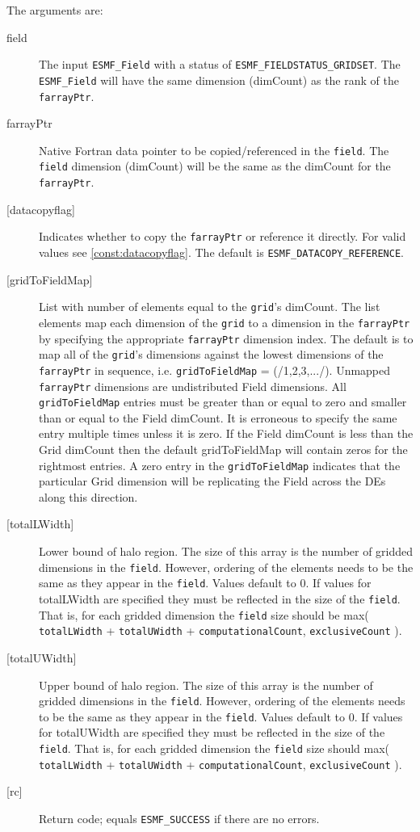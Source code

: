   The arguments are: 
   \begin{description} 
   \item [field] 
   The input {\tt ESMF\_Field} with a status of 
   {\tt ESMF\_FIELDSTATUS\_GRIDSET}. 
   The {\tt ESMF\_Field} will have the same dimension 
   (dimCount) as the rank of the {\tt farrayPtr}. 
   \item [farrayPtr] 
   Native Fortran data pointer to be copied/referenced in the {\tt field}. 
   The {\tt field} dimension (dimCount) will be the same as the dimCount 
   for the {\tt farrayPtr}. 
   \item [{[datacopyflag]}] 
   Indicates whether to copy the {\tt farrayPtr} or reference it directly. 
   For valid values see \ref{const:datacopyflag}. The default is 
   {\tt ESMF\_DATACOPY\_REFERENCE}. 
   \item [{[gridToFieldMap]}] 
   List with number of elements equal to the 
   {\tt grid}'s dimCount. The list elements map each dimension 
   of the {\tt grid} to a dimension in the {\tt farrayPtr} by 
   specifying the appropriate {\tt farrayPtr} dimension index. The 
   default is to map all of the {\tt grid}'s dimensions against the 
   lowest dimensions of the {\tt farrayPtr} in sequence, i.e. 
   {\tt gridToFieldMap} = (/1,2,3,.../). 
   Unmapped {\tt farrayPtr} dimensions are undistributed Field 
   dimensions. 
   All {\tt gridToFieldMap} entries must be greater than or equal 
   to zero and smaller than or equal to the Field dimCount. It is erroneous 
   to specify the same entry multiple times unless it is zero. 
   If the Field dimCount is less than the Grid dimCount then the default 
   gridToFieldMap will contain zeros for the rightmost entries. A zero 
   entry in the {\tt gridToFieldMap} indicates that the particular 
   Grid dimension will be replicating the Field across the DEs along 
   this direction. 
   \item [{[totalLWidth]}] 
   Lower bound of halo region. The size of this array is the number 
   of gridded dimensions in the {\tt field}. However, ordering of the elements 
   needs to be the same as they appear in the {\tt field}. Values default 
   to 0. If values for totalLWidth are specified they must be reflected in 
   the size of the {\tt field}. That is, for each gridded dimension the 
   {\tt field} size should be max( {\tt totalLWidth} + {\tt totalUWidth} 
   + {\tt computationalCount}, {\tt exclusiveCount} ). 
   \item [{[totalUWidth]}] 
   Upper bound of halo region. The size of this array is the number 
   of gridded dimensions in the {\tt field}. However, ordering of the elements 
   needs to be the same as they appear in the {\tt field}. Values default 
   to 0. If values for totalUWidth are specified they must be reflected in 
   the size of the {\tt field}. That is, for each gridded dimension the 
   {\tt field} size should max( {\tt totalLWidth} + {\tt totalUWidth} 
   + {\tt computationalCount}, {\tt exclusiveCount} ). 
   \item [{[rc]}] 
   Return code; equals {\tt ESMF\_SUCCESS} if there are no errors. 
   \end{description} 
    
